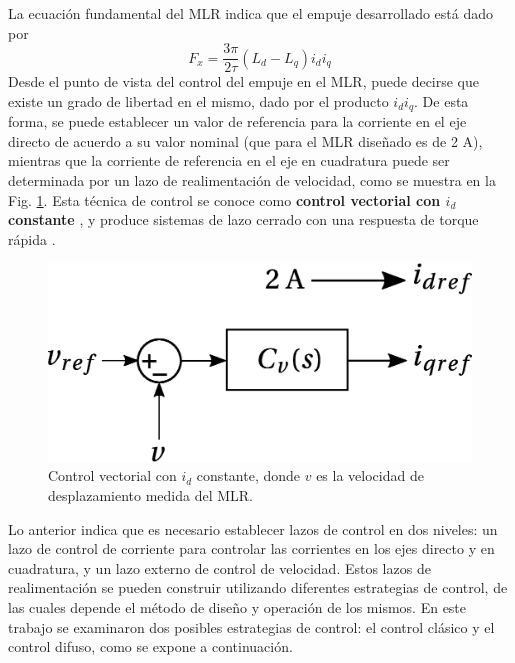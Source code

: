 La ecuación fundamental del MLR indica que el empuje desarrollado está dado por
\begin{equation}
F_x = \frac{3\pi}{2\tau}(L_d - L_q)i_d i_q
\end{equation}
Desde el punto de vista del control del empuje en el MLR, puede decirse que existe un grado de libertad en el mismo, dado por el producto $i_d i_q$. De esta forma, se puede establecer un valor de referencia para la corriente en el eje directo de acuerdo a su valor nominal (que para el MLR diseñado es de 2 A), mientras que la corriente de referencia en el eje en cuadratura puede ser determinada por un lazo de realimentación de velocidad, como se muestra en la Fig. \ref{fig:constantid}. Esta técnica de control se conoce como \textbf{control vectorial con $i_d$ constante} \cite{betz1993}, y produce sistemas de lazo cerrado con una respuesta de torque rápida \cite{jeanpaul2011}.

\begin{figure}[t]
\centering
\includegraphics[scale=0.285]{../img/Diseno_de_un_controlador_de_velocidad/constantid.eps}
\caption{Control vectorial con $i_d$ constante, donde $v$ es la velocidad de desplazamiento medida del MLR.}
\label{fig:constantid}
\end{figure}

Lo anterior indica que es necesario establecer lazos de control en dos niveles: un lazo de control de corriente para controlar las corrientes en los ejes directo y en cuadratura, y un lazo externo de control de velocidad. Estos lazos de realimentación se pueden construir utilizando diferentes estrategias de control, de las cuales depende el método de diseño y operación de los mismos. En este trabajo se examinaron dos posibles estrategias de control: el control clásico y el control difuso, como se expone a continuación.

